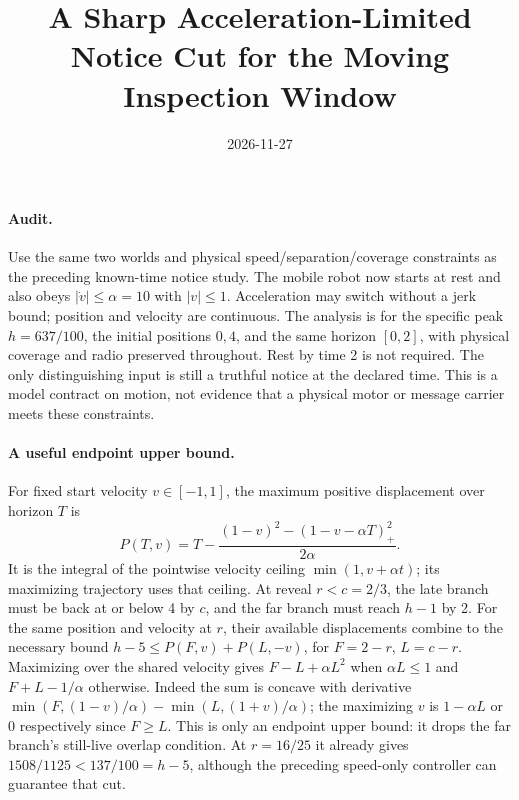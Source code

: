 \documentclass[11pt]{article}
\title{A Sharp Acceleration-Limited Notice Cut for the Moving Inspection Window}
\date{2026-11-27}
\begin{document}
\maketitle

\paragraph{Audit.}
Use the same two worlds and physical speed/separation/coverage
constraints as the preceding known-time notice study. The mobile
robot now starts at rest and also obeys \(|\dot v|\le\alpha=10\)
with \(|v|\le1\). Acceleration may switch without a jerk bound;
position and velocity are continuous. The analysis is for the
specific peak \(h=637/100\), the initial positions \(0,4\), and
the same horizon \([0,2]\), with physical coverage and radio
preserved throughout. Rest by time 2 is not required. The
only distinguishing input is still a truthful notice at the
declared time. This is a model contract on motion, not evidence
that a physical motor or message carrier meets these constraints.

\paragraph{A useful endpoint upper bound.}
For fixed start velocity \(v\in[-1,1]\), the maximum positive
displacement over horizon \(T\) is
\[
  P(T,v)=T-\frac{(1-v)^2-(1-v-\alpha T)_+^2}{2\alpha}.
\]
It is the integral of the pointwise velocity ceiling
\(\min(1,v+\alpha t)\); its maximizing trajectory uses that ceiling.
At reveal \(r<c=2/3\), the late branch must be back at or below 4
by \(c\), and the far branch must reach \(h-1\) by 2. For the same
position and velocity at \(r\), their available displacements
combine to the necessary bound
\(h-5\le P(F,v)+P(L,-v)\), for \(F=2-r\), \(L=c-r\).
Maximizing over the shared velocity gives \(F-L+\alpha L^2\)
when \(\alpha L\le1\) and \(F+L-1/\alpha\) otherwise.
Indeed the sum is concave with derivative
\(\min(F,(1-v)/\alpha)-\min(L,(1+v)/\alpha)\);
the maximizing \(v\) is \(1-\alpha L\) or \(0\) respectively
since \(F\ge L\). This is only an endpoint upper bound:
it drops the far branch's still-live overlap condition.
At \(r=16/25\) it already gives \(1508/1125<137/100=h-5\), although
the preceding speed-only controller can guarantee that cut.
\end{document}
